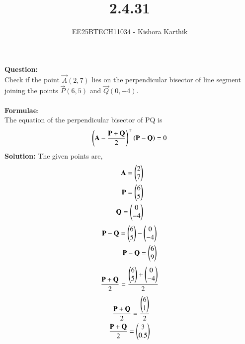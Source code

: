\documentclass[journal]{IEEEtran}
\begin{document}

\vspace{3cm}

\title{2.4.31}
\author{EE25BTECH11034 - Kishora Karthik}
{\let\newpage\relax\maketitle}

\renewcommand{\thefigure}{\theenumi}
\renewcommand{\thetable}{\theenumi}
\textbf{Question:}\\
Check if the point $\vec{A}(2, 7)$ lies on the perpendicular bisector of line segment joining the points
$\vec{P}(6, 5)$ and $\vec{Q}(0, -4)$.\\\\
\textbf{Formulae}:\\
The equation of the perpendicular bisector of PQ is\\
\begin{align}
    \left(\mathbf{A}-\frac{\mathbf{P}+\mathbf{Q}}{2}\right)^\top\left(\mathbf{P}-\mathbf{Q}\right)=0
\end{align}
\textbf{Solution:}
The given points are,\\
\begin{align}
    \mathbf{A}=\begin{pmatrix}2\\7\end{pmatrix}\\
    \mathbf{P}=\begin{pmatrix}6\\5\end{pmatrix}\\
    \mathbf{Q}=\begin{pmatrix}0\\-4\end{pmatrix}
\end{align}
\begin{align}
    \mathbf{P}-\mathbf{Q}=\begin{pmatrix}6\\5\end{pmatrix}-\begin{pmatrix}0\\-4\end{pmatrix}\\
    \mathbf{P}-\mathbf{Q}=\begin{pmatrix}6\\9\end{pmatrix}
\end{align}
\begin{align}
    \frac{\mathbf{P}+\mathbf{Q}}{2}={\frac{\begin{pmatrix}6\\5\end{pmatrix}+\begin{pmatrix}0\\-4\end{pmatrix}}{2}}
\end{align}
\begin{align}
    \frac{\mathbf{P}+\mathbf{Q}}{2}={\frac{\begin{pmatrix}6\\1\end{pmatrix}}{2}}\\
    \frac{\mathbf{P}+\mathbf{Q}}{2}=\begin{pmatrix}3\\0.5\end{pmatrix}   
\end{align}
\end{document}
